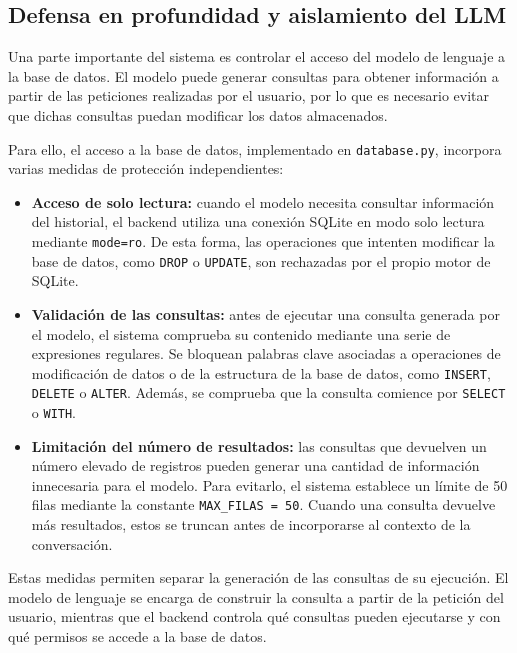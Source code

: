 \subsection{Defensa en profundidad y aislamiento del LLM}

Una parte importante del sistema es controlar el acceso del modelo de lenguaje
a la base de datos. El modelo puede generar consultas para obtener información
a partir de las peticiones realizadas por el usuario, por lo que es necesario
evitar que dichas consultas puedan modificar los datos almacenados.

Para ello, el acceso a la base de datos, implementado en
\texttt{database.py}, incorpora varias medidas de protección independientes:

\begin{itemize}

    \item \textbf{Acceso de solo lectura:} cuando el modelo necesita consultar
    información del historial, el backend utiliza una conexión SQLite en modo
    solo lectura mediante \texttt{mode=ro}. De esta forma, las operaciones que
    intenten modificar la base de datos, como \texttt{DROP} o \texttt{UPDATE},
    son rechazadas por el propio motor de SQLite.

    \item \textbf{Validación de las consultas:} antes de ejecutar una consulta
    generada por el modelo, el sistema comprueba su contenido mediante una serie
    de expresiones regulares. Se bloquean palabras clave asociadas a operaciones
    de modificación de datos o de la estructura de la base de datos, como
    \texttt{INSERT}, \texttt{DELETE} o \texttt{ALTER}. Además, se comprueba que
    la consulta comience por \texttt{SELECT} o \texttt{WITH}.

    \item \textbf{Limitación del número de resultados:} las consultas que
    devuelven un número elevado de registros pueden generar una cantidad de
    información innecesaria para el modelo. Para evitarlo, el sistema establece
    un límite de 50 filas mediante la constante \texttt{MAX\_FILAS = 50}.
    Cuando una consulta devuelve más resultados, estos se truncan antes de
    incorporarse al contexto de la conversación.
    
\end{itemize}

Estas medidas permiten separar la generación de las consultas de su ejecución.
El modelo de lenguaje se encarga de construir la consulta a partir de la
petición del usuario, mientras que el backend controla qué consultas pueden
ejecutarse y con qué permisos se accede a la base de datos.